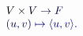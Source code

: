 \documentclass[12pt]{article}
\begin{document}
\makeatletter
\renewcommand*{\@textcolor}[3]{%
  \protect\leavevmode
  \begingroup
    \color#1{#2}#3%
  \endgroup
}
\makeatother
\begin{displaymath}
\begin{array}{l}
V \mathcolor[RGB]{0,0,15}{\times} \mathcolor[RGB]{0,0,30}{V} \mathcolor[RGB]{0,0,45}{\rightarrow} \mathcolor[RGB]{0,0,60}{F} \mathcolor[RGB]{0,0,75}{\\
(u,} \mathcolor[RGB]{0,0,90}{v)} \mathcolor[RGB]{0,0,105}{\mapsto\langle} \mathcolor[RGB]{0,0,120}{u,} \mathcolor[RGB]{0,0,135}{v\rangle} \mathcolor[RGB]{0,0,150}{.
\end{array}}
\end{displaymath}
\end{document}
